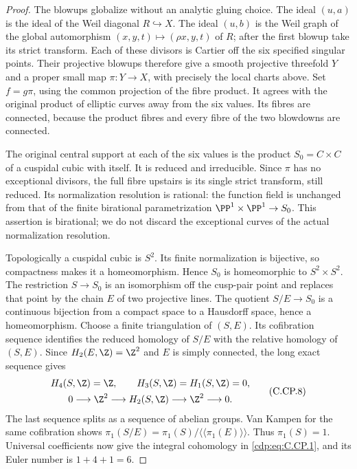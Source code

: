 \begin{proof}
The blowups globalize without an analytic gluing choice.
The ideal $(u,a)$ is the ideal of the Weil diagonal
$R\hookrightarrow X$. The ideal $(u,b)$ is the Weil
graph of the global automorphism
$(x,y,t)\mapsto(\rho x,y,t)$ of $R$; after the first
blowup take its strict transform. Each of these divisors
is Cartier off the six specified singular points.
Their projective blowups therefore give a smooth
projective threefold $Y$ and a proper small map
$\pi:Y\to X$, with precisely the local charts above.
Set $f=g\pi$, using the common projection of the fibre
product. It agrees with the original product of elliptic
curves away from the six values. Its fibres are connected,
because the product fibres and every fibre of the two
blowdowns are connected.

The original central support at each of the six values
is the product $S_0=C\times C$ of a cuspidal cubic with
itself. It is reduced and irreducible. Since $\pi$ has
no exceptional divisors, the full fibre upstairs is its
single strict transform, still reduced. Its normalization
resolution is rational: the function field is unchanged
from that of the finite birational parametrization
$\PP^1\times\PP^1\to S_0$. This assertion is birational;
we do not discard the exceptional curves of the actual
normalization resolution.

Topologically a cuspidal cubic is $S^2$. Its finite
normalization is bijective, so compactness makes it a
homeomorphism. Hence $S_0$ is homeomorphic to
$S^2\times S^2$. The restriction $S\to S_0$ is an
isomorphism off the cusp-pair point and replaces that
point by the chain $E$ of two projective lines. The
quotient $S/E\to S_0$ is a continuous bijection from a
compact space to a Hausdorff space, hence a homeomorphism.
Choose a finite triangulation of $(S,E)$. Its cofibration
sequence identifies the reduced homology of $S/E$ with
the relative homology of $(S,E)$. Since
$H_2(E,\Z)=\Z^2$ and $E$ is simply connected, the
long exact sequence gives
\[
 \begin{gathered}
 H_4(S,\Z)=\Z,\qquad H_3(S,\Z)=H_1(S,\Z)=0,\\
 0\longrightarrow\Z^2\longrightarrow H_2(S,\Z)
                 \longrightarrow\Z^2\longrightarrow0.
 \end{gathered}                                  \tag{C.CP.8}\label{cdp:eq:C.CP.8}
\]
The last sequence splits as a sequence of abelian groups.
Van Kampen for the same cofibration shows
$\pi_1(S/E)=\pi_1(S)/\langle\!\langle\pi_1(E)\rangle\!\rangle$.
Thus $\pi_1(S)=1$. Universal coefficients now give the
integral cohomology in \eqref{cdp:eq:C.CP.1}, and its Euler number
is $1+4+1=6$.


\end{proof}
